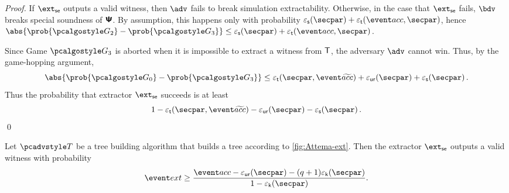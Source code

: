 \begin{proof}
	If $\extse$ outputs a valid witness, then $\adv$ fails to break simulation extractability. Otherwise, in the case that $\extse$ fails, $\bdv$ breaks special soundness of $\bm{\mathsf{\Psi}}$. By assumption, this happens only with probability $\epss(\secpar) + \epst(\accProb, \secpar)$, hence $\abs{\prob{\game{2}} - \prob{\game{3}}} \leq \epss(\secpar) + \epst(\accProb, \secpar)$.
	
	 Since Game $\game{3}$ is aborted when it is impossible to
	extract a witness from $\mathsf{T}$,
	the adversary $\advse$ cannot win. Thus, by the game-hopping argument,
	\[
	\abs{\prob{\game{0}} - \prob{\game{3}}} \leq \epst(\secpar, \waccProb)
		 + \epsur(\secpar) + \epss(\secpar)\,.
	\]
	Thus the probability that extractor $\extse$ succeeds is at least
	\[
	1 - \epst(\secpar, \waccProb) - 
	\epsur(\secpar)
	- \epss(\secpar)\,.
	\]
	\qed
	\end{proof}
	
	\begin{corollary}
		Let $\tdv$ be a tree building algorithm that builds a tree according to \cref{fig:Attema-ext}. Then the extractor $\extse$ outputs a valid witness with probability 
		\begin{equation}
			\label{eq:frk}
			\extProb \geq \frac{\accProb - \epsur(\secpar) - (q + 1) \epsk(\secpar)}{1 - \epsk(\secpar)}.
			\end{equation} 
\end{corollary}


